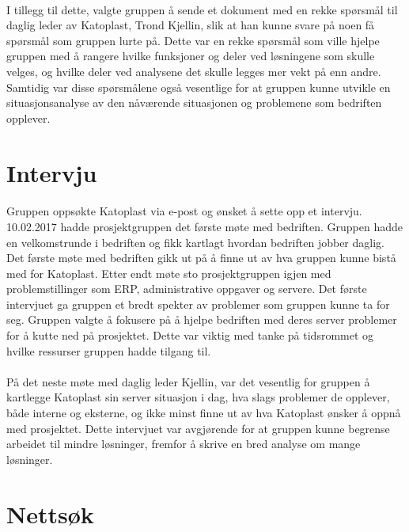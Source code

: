 \paragraph{} I tillegg til dette, valgte gruppen å sende et dokument med en rekke spørsmål til daglig leder av Katoplast, Trond Kjellin, slik at han kunne svare på noen få spørsmål som gruppen lurte på. Dette var en rekke spørsmål som ville hjelpe gruppen med å rangere  hvilke funksjoner og deler ved løsningene som skulle velges, og hvilke deler ved analysene det skulle legges mer vekt på enn andre. Samtidig var disse spørsmålene også vesentlige for at gruppen kunne utvikle en situasjonsanalyse av den nåværende situasjonen og problemene som bedriften opplever. 

\section{Intervju}
\paragraph{} Gruppen oppsøkte Katoplast via e-post og ønsket å sette opp et intervju. 10.02.2017 hadde prosjektgruppen det første møte med bedriften. Gruppen hadde en velkomstrunde i bedriften og fikk kartlagt hvordan bedriften jobber daglig. Det første møte med bedriften gikk ut på å finne ut av hva gruppen kunne bistå med for Katoplast. Etter endt møte sto prosjektgruppen igjen med problemstillinger som ERP, administrative oppgaver og servere. Det første intervjuet ga gruppen et bredt spekter av problemer som gruppen kunne ta for seg. Gruppen valgte å fokusere på å hjelpe bedriften med deres server problemer for å kutte ned på prosjektet. Dette var viktig med tanke på tidsrommet og hvilke ressurser gruppen hadde tilgang til.

\paragraph{} På det neste møte med daglig leder Kjellin, var det vesentlig for gruppen å kartlegge Katoplast sin server situasjon i dag, hva slags problemer de opplever, både interne og eksterne, og ikke minst finne ut av hva Katoplast ønsker å oppnå med prosjektet. Dette intervjuet var avgjørende for at gruppen kunne begrense arbeidet til mindre løsninger, fremfor å skrive en bred analyse om mange løsninger.

\section{Nettsøk}
